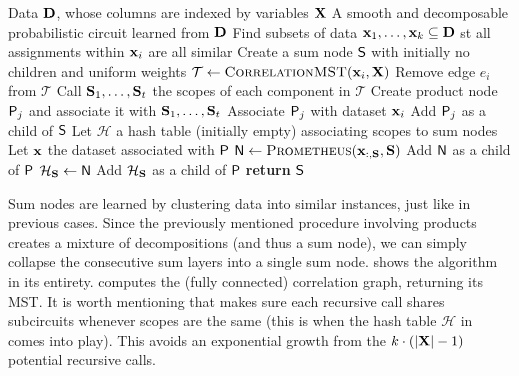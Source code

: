\begin{algorithm}[t]
  \caption{}\label{alg:prometheus}
  \begin{algorithmic}[1]
    \Require Data $\mathbf{D}$, whose columns are indexed by variables $\mathbf{X}$
    \Ensure A smooth and decomposable probabilistic circuit learned from $\mathbf{D}$
    \NIElse
      \State Find subsets of data $\mathbf{x}_1,\ldots,\mathbf{x}_k\subseteq\mathbf{D}$ st all assignments
        within $\mathbf{x}_i$ are all similar
      \State Create a sum node $\operatorname{\textsf{S}}$ with initially no children and uniform weights
        \State $\mathcal{T}\gets\textproc{CorrelationMST}(\set{x}_i,\set{X})$
          \State Remove edge $e_i$ from $\mathcal{T}$
          \State Call $\mathbf{S}_1,\ldots,\mathbf{S}_t$ the scopes of each component in $\mathcal{T}$
          \State Create product node $\operatorname{\textsf{P}}_j$ and associate it with $\mathbf{S}_1,\ldots,\mathbf{S}_t$
          \State Associate $\operatorname{\textsf{P}}_j$ with dataset $\mathbf{x}_i$
          \State Add $\operatorname{\textsf{P}}_j$ as a child of $\operatorname{\textsf{S}}$
        \EndFor
      \EndFor
      \State Let $\mathcal{H}$ a hash table (initially empty) associating scopes to sum nodes
            \State Let $\mathbf{x}$ the dataset associated with $\operatorname{\textsf{P}}$
            \State $\Node\gets\textproc{Prometheus}(\set{x}_{:,\set{S}},\set{S})$
            \State Add $\operatorname{\textsf{N}}$ as a child of $\operatorname{\textsf{P}}$
            \State $\mathcal{H}_{\mathbf{S}}\gets\operatorname{\textsf{N}}$
          \Else
            \State Add $\mathcal{H}_{\mathbf{S}}$ as a child of $\operatorname{\textsf{P}}$
          \EndIf
        \EndFor
      \EndFor
      \State \textbf{return} $\operatorname{\textsf{S}}$
    \EndNIElse
  \end{algorithmic}
\end{algorithm}

Sum nodes are learned by clustering data into similar instances, just like in previous cases. Since
the previously mentioned procedure involving products creates a mixture of decompositions (and thus
a sum node), we can simply collapse the consecutive sum layers into a single sum node.
 shows the algorithm in its entirety.  computes the
(fully connected) correlation graph, returning its MST. It is worth mentioning that
 makes sure each recursive call shares subcircuits whenever scopes are the
same (this is when the hash table $\mathcal{H}$ in  comes into play). This
avoids an exponential growth from the $k\cdot(|\mathbf{X}|-1)$ potential recursive calls.

